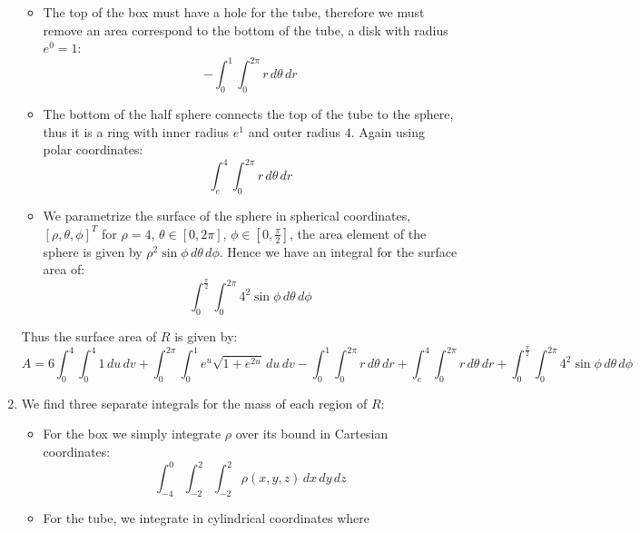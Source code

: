 \documentclass[a4paper, 11pt]{article}
\begin{document}
\begin{enumerate}[label=(\alph*)]
\begin{itemize}
		      \item The top of the box must have a hole for the tube,
		            therefore we must remove an area correspond to the bottom of
		            the tube, a disk with radius $e^{0}=1$:
		            \[
			            - \int_0^1\int_0^{2\pi} r\,d\theta\,dr
		            \]
		      \item The bottom of the half sphere connects the top of the tube
		            to the sphere, thus it is a ring with inner radius $e^1$ and
		            outer radius $4$. Again using polar coordinates:
		            \[
			            \int_e^4\int_0^{2\pi} r\,d\theta\,dr
		            \]
		      \item We parametrize the surface of the sphere in spherical
		            coordinates, $[\rho,\theta,\phi]^T$ for $\rho=4$, $\theta\in[0,2\pi]$,
		            $\phi\in[0,\frac{\pi}2]$, the area element of the sphere is given by
		            $\rho^2\sin\phi\,d\theta\,d\phi$. Hence we have an integral
		            for the surface area of:
		            \[
			            \int_0^{\frac{\pi}2} \int_0^{2\pi}4^2\sin\phi \,d \theta \,d \phi
		            \]
	      \end{itemize}
	      Thus the surface area of $R$ is given by:
	      \[
		      A =
		      6\int_0^4\int_0^{4} 1 \,du\,dv
		      +\int_0^{2\pi}\int_0^1 e^{u}\sqrt{1+e^{2u}} \,du \,dv
		      -\int_0^1\int_0^{2\pi} r \,d\theta\,dr
		      +\int_e^4\int_0^{2\pi} r\,d\theta\,dr
		      +\int_0^{\frac{\pi}2} \int_0^{2\pi}4^2\sin\phi \,d\theta\, d\phi
	      \]
	\item We find three separate integrals for the mass of each region of
	      $R$:
	      \begin{itemize}
		      \item For the box we simply integrate $\rho$ over its bound in Cartesian
		            coordinates:
		            \[
			            \int_{-4}^0\int_{-2}^2\int_{-2}^2\rho(x,y,z)\,d x \,d y \,d z
		            \]
		      \item For the tube, we integrate in cylindrical coordinates where

\end{itemize}
\end{enumerate}
\end{document}
